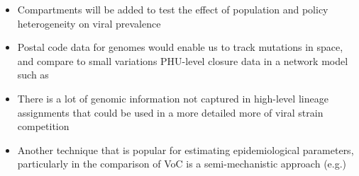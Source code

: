 \documentclass{article}
\begin{document}
\begin{itemize}
    \item Compartments will be added to test the effect of population and policy heterogeneity on viral prevalence
    \item Postal code data for genomes would enable us to track mutations in space, and compare to small variations PHU-level closure data in a network model such as \cite{Fair_Karatayev_Anand_Bauch_2021}
    
    \item There is a lot of genomic information not captured in high-level lineage assignments that could be used in a more 
    detailed 
    more of 
    viral strain competition

    \item Another technique that is popular for estimating epidemiological parameters, particularly in the comparison of VoC is a semi-mechanistic approach (e.g.\cite{Cauchemez_Nouvellet,Fraser_2007,Mishra_Berah_Mellan_Unwin_Vollmer_Parag_Gandy_Flaxman_Bhatt_2020,Nouvellet_Cori, Wallinga_Lipsitch_2007, Brown_Joh_Buchan_Daneman_Mishra_Patel_Day_2021})
\end{itemize}
\end{document}
